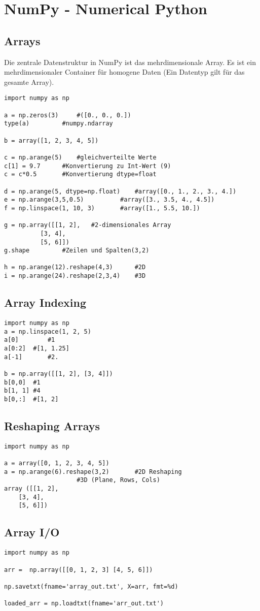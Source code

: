 \chapter{NumPy - Numerical Python}
\section{Arrays}
Die zentrale Datenstruktur in NumPy ist das mehrdimensionale Array. Es ist ein mehrdimensionaler Container für homogene Daten (Ein Datentyp gilt für das gesamte Array).
\begin{lstlisting}
import numpy as np

a = np.zeros(3)		#([0., 0., 0.])
type(a)			#numpy.ndarray

b = array([1, 2, 3, 4, 5])

c = np.arange(5)	#gleichverteilte Werte
c[1] = 9.7		#Konvertierung zu Int-Wert (9)
c = c*0.5		#Konvertierung dtype=float

d = np.arange(5, dtype=np.float)    #array([0., 1., 2., 3., 4.])
e = np.arange(3,5,0.5)		    #array([3., 3.5, 4., 4.5])
f = np.linspace(1, 10, 3)	    #array([1., 5.5, 10.])

g = np.array([[1, 2],	#2-dimensionales Array
	      [3, 4],
	      [5, 6]])		
g.shape			#Zeilen und Spalten(3,2)

h = np.arange(12).reshape(4,3)	    #2D
i = np.arange(24).reshape(2,3,4)    #3D

\end{lstlisting}
\section{Array Indexing}
\begin{lstlisting}
import numpy as np
a = np.linspace(1, 2, 5)
a[0]		#1
a[0:2]	#[1, 1.25]
a[-1]		#2.

b = np.array([[1, 2], [3, 4]])
b[0,0]	#1
b[1, 1]	#4
b[0,:]	#[1, 2]
\end{lstlisting}
\section{Reshaping Arrays}
\begin{lstlisting}
import numpy as np

a = array([0, 1, 2, 3, 4, 5])
a = np.arange(6).reshape(3,2)	    #2D Reshaping
				    #3D (Plane, Rows, Cols)
array ([[1, 2],
	[3, 4],
	[5, 6]])	
\end{lstlisting}
\section{Array I/O}
\begin{lstlisting}
import numpy as np

arr =  np.array([[0, 1, 2, 3] [4, 5, 6]])

np.savetxt(fname='array_out.txt', X=arr, fmt=%d)

loaded_arr = np.loadtxt(fname='arr_out.txt')
\end{lstlisting}

